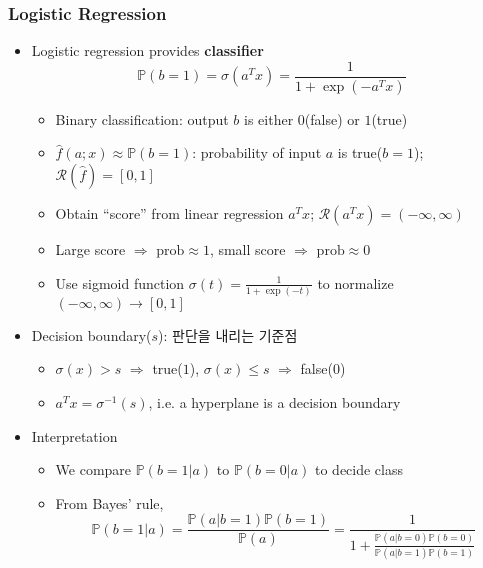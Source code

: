 \subsubsection*{Logistic Regression}
\begin{itemize}
    \item Logistic regression provides \textbf{classifier}
    \begin{equation}\label{eq:dl:logistic-classifier}
        \mathbb{P}(b=1)=\sigma(a^Tx)=\frac{1}{1+\exp(-a^Tx)}
    \end{equation}
    \begin{itemize}
        \item Binary classification: output $b$ is either $0$(false) or $1$(true)
        \item $\hat{f}(a;x)\approx\mathbb{P}(b=1)$: probability of input $a$ is true($b=1$); $\mathcal{R}(\hat{f})=[0,1]$
        \item Obtain ``score'' from linear regression $a^Tx$; $\mathcal{R}(a^Tx)=(-\infty,\infty)$
        \item Large score $\Rightarrow$ $\mathrm{prob}\approx1$, small score $\Rightarrow$ $\mathrm{prob}\approx0$
        \item Use sigmoid function $\sigma(t)=\frac{1}{1+\exp(-t)}$ to normalize $(-\infty,\infty)\rightarrow[0,1]$
    \end{itemize}
    \begin{figures}
    \end{figures}
    \item Decision boundary($s$): 판단을 내리는 기준점
    \begin{itemize}
        \item $\sigma(x)>s$ $\Rightarrow$ true($1$), $\sigma(x)\leq s$ $\Rightarrow$ false($0$)
        \item $a^Tx=\sigma^{-1}(s)$, i.e. a hyperplane is a decision boundary
    \end{itemize}
    \item Interpretation
    \begin{itemize}
        \item We compare $\mathbb{P}(b=1|a)$ to $\mathbb{P}(b=0|a)$ to decide class
        \item From Bayes' rule,
        \begin{equation}
            \mathbb{P}(b=1|a)=\frac{\mathbb{P}(a|b=1)\mathbb{P}(b=1)}{\mathbb{P}(a)}=\frac{1}{1+\frac{\mathbb{P}(a|b=0)\mathbb{P}(b=0)}{\mathbb{P}(a|b=1)\mathbb{P}(b=1)}}

\end{equation}
\end{itemize}
\end{itemize}
